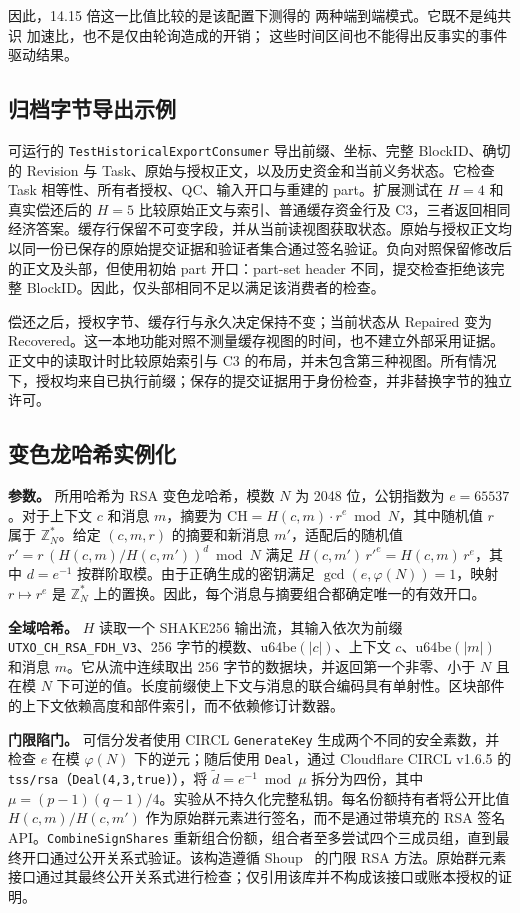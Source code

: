 因此，14.15 倍这一比值比较的是该配置下测得的
两种端到端模式。它既不是纯共识
加速比，也不是仅由轮询造成的开销；
这些时间区间也不能得出反事实的事件驱动结果。

\subsection{归档字节导出示例}
可运行的 \texttt{TestHistoricalExportConsumer} 导出前缀、坐标、完整 BlockID、确切的 Revision 与 Task、原始与授权正文，以及历史资金和当前义务状态。它检查 Task 相等性、所有者授权、QC、输入开口与重建的 part。扩展测试在 $H=4$ 和真实偿还后的 $H=5$ 比较原始正文与索引、普通缓存资金行及 C3，三者返回相同经济答案。缓存行保留不可变字段，并从当前读视图获取状态。原始与授权正文均以同一份已保存的原始提交证据和验证者集合通过签名验证。负向对照保留修改后的正文及头部，但使用初始 part 开口：part-set header 不同，提交检查拒绝该完整 BlockID。因此，仅头部相同不足以满足该消费者的检查。

偿还之后，授权字节、缓存行与永久决定保持不变；当前状态从 Repaired 变为 Recovered。这一本地功能对照不测量缓存视图的时间，也不建立外部采用证据。正文中的读取计时比较原始索引与 C3 的布局，并未包含第三种视图。所有情况下，授权均来自已执行前缀；保存的提交证据用于身份检查，并非替换字节的独立许可。

\subsection{变色龙哈希实例化}
\label{sec:ch-params}

\noindent\textbf{参数。} 所用哈希为 RSA 变色龙哈希，模数 $N$ 为 2048 位，公钥指数为 $e=65537$。对于上下文 $c$ 和消息 $m$，摘要为 $\mathrm{CH}=H(c,m)\cdot r^{e}\bmod N$，其中随机值 $r$ 属于 $\mathbb{Z}_N^{*}$。给定 $(c,m,r)$ 的摘要和新消息 $m'$，适配后的随机值 $r'=r\,(H(c,m)/H(c,m'))^{d}\bmod N$ 满足 $H(c,m')\,r'^{e}=H(c,m)\,r^{e}$，其中 $d=e^{-1}$ 按群阶取模。由于正确生成的密钥满足 $\gcd(e,\varphi(N))=1$，映射 $r\mapsto r^e$ 是 $\mathbb{Z}_N^{*}$ 上的置换。因此，每个消息与摘要组合都确定唯一的有效开口。

\noindent\textbf{全域哈希。} $H$ 读取一个 SHAKE256 输出流，其输入依次为前缀 \texttt{UTXO\_CH\_RSA\_FDH\_V3}、256 字节的模数、$\mathrm{u64be}(|c|)$、上下文 $c$、$\mathrm{u64be}(|m|)$ 和消息 $m$。它从流中连续取出 256 字节的数据块，并返回第一个非零、小于 $N$ 且在模 $N$ 下可逆的值。长度前缀使上下文与消息的联合编码具有单射性。区块部件的上下文依赖高度和部件索引，而不依赖修订计数器。

\noindent\textbf{门限陷门。} 可信分发者使用 CIRCL \texttt{GenerateKey} 生成两个不同的安全素数，并检查 $e$ 在模 $\varphi(N)$ 下的逆元；随后使用 \texttt{Deal}，通过 Cloudflare CIRCL v1.6.5 的 \texttt{tss/rsa}（\texttt{Deal(4,3,true)}），将 $\widetilde d=e^{-1}\bmod\mu$ 拆分为四份，其中 $\mu=(p-1)(q-1)/4$。实验从不持久化完整私钥。每名份额持有者将公开比值 $H(c,m)/H(c,m')$ 作为原始群元素进行签名，而不是通过带填充的 RSA 签名 API。\texttt{CombineSignShares} 重新组合份额，组合者至多尝试四个三成员组，直到最终开口通过公开关系式验证。该构造遵循 Shoup~\cite{shoup} 的门限 RSA 方法。原始群元素接口通过其最终公开关系式进行检查；仅引用该库并不构成该接口或账本授权的证明。

